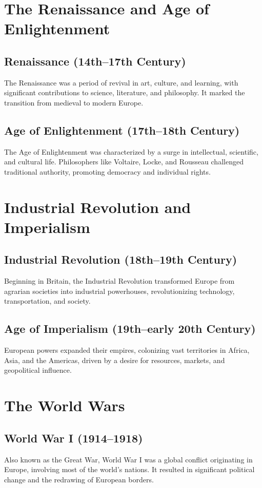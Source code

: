 \documentclass[a4paper,12pt]{book}
\begin{document}
\section{The Renaissance and Age of Enlightenment}
\label{sec:renaissance-enlightenment}
\subsection{Renaissance (14th–17th Century)}
The Renaissance was a period of revival in art, culture, and learning, with significant contributions to science, literature, and philosophy. It marked the transition from medieval to modern Europe.

\subsection{Age of Enlightenment (17th–18th Century)}
The Age of Enlightenment was characterized by a surge in intellectual, scientific, and cultural life. Philosophers like Voltaire, Locke, and Rousseau challenged traditional authority, promoting democracy and individual rights.

\section{Industrial Revolution and Imperialism}
\label{sec:industrial-revolution-imperialism}
\subsection{Industrial Revolution (18th–19th Century)}
Beginning in Britain, the Industrial Revolution transformed Europe from agrarian societies into industrial powerhouses, revolutionizing technology, transportation, and society.

\subsection{Age of Imperialism (19th–early 20th Century)}
European powers expanded their empires, colonizing vast territories in Africa, Asia, and the Americas, driven by a desire for resources, markets, and geopolitical influence.

\section{The World Wars}
\label{sec:world-wars}
\subsection{World War I (1914–1918)}
Also known as the Great War, World War I was a global conflict originating in Europe, involving most of the world’s nations. It resulted in significant political change and the redrawing of European borders.
\end{document}
